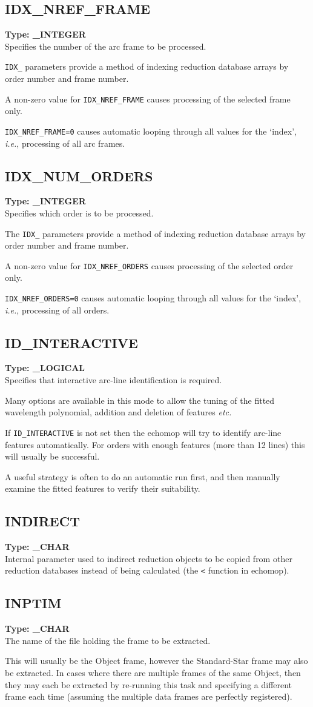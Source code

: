 \documentclass[11pt,twoside]{article}
\makeatletter
\newcommand{\stardocinitials}  {SUN}
\newcommand{\stardocnumber}    {152.4}
\newcommand{\stardocname}{\stardocinitials /\stardocnumber}
\newcommand{\xlabel}[1]{}
\newcommand{\indexcmdname}[1]{\index{#1@\protect\cmdname{#1}}}
\renewcommand{\indexcmdname}[1]{}
\newcommand{\cmdname}{\begingroup \catcode`\_=12 \realcmdname}
\newcommand{\realcmdname}[1]{\endgroup\texttt{#1}}
\newcommand{\echparameter}[4]
{
\item [#1 = #3] \mbox{}\label{par_#2}\indexcmdname{#2}
\\
#4
}
\renewcommand{\echparameter}[4]
{
  \subsection{\xlabel{par_#2}\label{par_#2}{\bf #1}}
  {\bf Type: #3}\\
#4
}
\makeatother
\begin{document}
\markboth{PARAMETERS: I}{\stardocname}
\echparameter{IDX\_NREF\_FRAME}{IDX_NREF_FRAME}{
 \_INTEGER
}{
 Specifies the number of the arc frame to be processed.

 {\tt IDX\_} parameters provide a method of indexing reduction database
 arrays by order number and frame number.

 A non-zero value for {\tt IDX\_NREF\_FRAME} causes processing of the
 selected frame only.

 {\tt IDX\_NREF\_FRAME=0} causes automatic looping through all values for
 the `index', {\it{i.e.}}, processing of all arc frames.
}

\echparameter{IDX\_NUM\_ORDERS}{IDX_NUM_ORDERS}{
 \_INTEGER
}{
 Specifies which order is to be processed.

 The {\tt IDX\_} parameters provide a method of indexing reduction
 database arrays by order number and frame number.

 A non-zero value for {\tt IDX\_NREF\_ORDERS} causes processing of the
 selected order only.

 {\tt IDX\_NREF\_ORDERS=0} causes automatic looping through all values for
 the `index', {\it{i.e.}}, processing of all orders.
}

\echparameter{ID\_INTERACTIVE}{ID_INTERACTIVE}{
 \_LOGICAL
}{
 Specifies that interactive arc-line identification is required.

 Many options are available in this mode to allow the tuning of
 the fitted wavelength polynomial, addition and deletion of features
 {\it etc.}

 If {\tt ID\_INTERACTIVE} is not set then the {\sc echomop} will try to
 identify arc-line features automatically.  For orders with enough features
 (more than 12 lines) this will usually be successful.

 A useful strategy is often to do an automatic run first, and then
 manually examine the fitted features to verify their suitability.
}

\echparameter{INDIRECT}{INDIRECT}{
 \_CHAR
}{
 Internal parameter used to indirect reduction objects to be copied
 from other reduction databases instead of being calculated
 (the \texttt{<} function in {\sc echomop}).
}

\echparameter{INPTIM}{INPTIM}{
 \_CHAR
}{
 The name of the file holding the frame to be extracted.

 This will
 usually be the Object frame, however the Standard-Star frame may
 also be extracted.  In cases where there are multiple frames of the
 same Object, then they may each be extracted by re-running this
 task and specifying a different frame each time (assuming the
 multiple data frames are perfectly registered).
}
\end{document}
